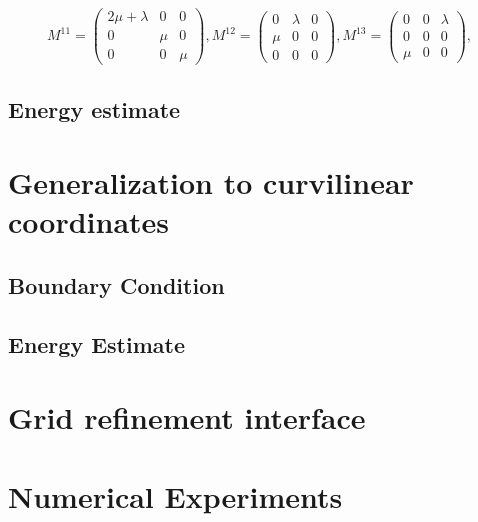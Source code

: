 \documentclass[a4paper]{article}
\begin{document}
\[ M^{11} = \left(\begin{array}{ccc}
2\mu+\lambda & 0 & 0\\
0 & \mu & 0\\
0 & 0 & \mu\end{array}\right), M^{12} = \left(\begin{array}{ccc}
0 & \lambda & 0\\
\mu & 0 & 0\\
0 & 0 & 0\end{array}\right), M^{13} = \left(\begin{array}{ccc}
0 & 0 & \lambda\\
0 & 0 & 0\\
\mu & 0 & 0\end{array}\right),\]




\subsection{Energy estimate}

\section{Generalization to curvilinear coordinates}

\subsection{Boundary Condition}

\subsection{Energy Estimate}

\section{Grid refinement interface}

\section{Numerical Experiments}
\end{document}
